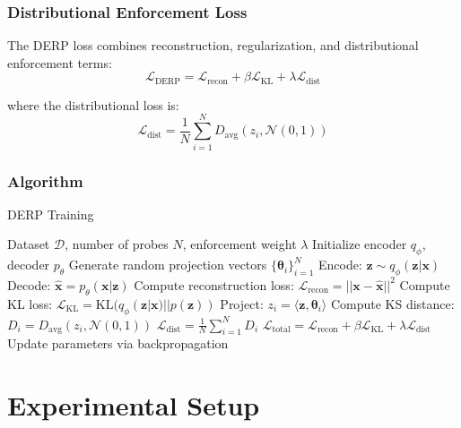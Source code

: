 \documentclass{article}
\begin{document}
\subsubsection{Distributional Enforcement Loss}

The DERP loss combines reconstruction, regularization, and distributional enforcement terms:
\begin{equation}
\mathcal{L}_{\text{DERP}} = \mathcal{L}_{\text{recon}} + \beta \mathcal{L}_{\text{KL}} + \lambda \mathcal{L}_{\text{dist}}
\end{equation}

where the distributional loss is:
\begin{equation}
\mathcal{L}_{\text{dist}} = \frac{1}{N} \sum_{i=1}^N D_{\text{avg}}(z_i, \mathcal{N}(0,1))
\end{equation}

\subsubsection{Algorithm}

\begin{algorithm}[h]
\caption{DERP Training}
\begin{algorithmic}[1]
\REQUIRE Dataset $\mathcal{D}$, number of probes $N$, enforcement weight $\lambda$
\STATE Initialize encoder $q_\phi$, decoder $p_\theta$
\STATE Generate random projection vectors $\{\boldsymbol{\theta}_i\}_{i=1}^N$
    \STATE Encode: $\mathbf{z} \sim q_\phi(\mathbf{z}|\mathbf{x})$
    \STATE Decode: $\hat{\mathbf{x}} = p_\theta(\mathbf{x}|\mathbf{z})$
    \STATE Compute reconstruction loss: $\mathcal{L}_{\text{recon}} = ||\mathbf{x} - \hat{\mathbf{x}}||^2$
    \STATE Compute KL loss: $\mathcal{L}_{\text{KL}} = \text{KL}(q_\phi(\mathbf{z}|\mathbf{x}) || p(\mathbf{z}))$
        \STATE Project: $z_i = \langle \mathbf{z}, \boldsymbol{\theta}_i \rangle$
        \STATE Compute KS distance: $D_i = D_{\text{avg}}(z_i, \mathcal{N}(0,1))$
    \ENDFOR
    \STATE $\mathcal{L}_{\text{dist}} = \frac{1}{N} \sum_{i=1}^N D_i$
    \STATE $\mathcal{L}_{\text{total}} = \mathcal{L}_{\text{recon}} + \beta \mathcal{L}_{\text{KL}} + \lambda \mathcal{L}_{\text{dist}}$
    \STATE Update parameters via backpropagation
\ENDFOR
\end{algorithmic}
\end{algorithm}

\section{Experimental Setup}
\end{document}
